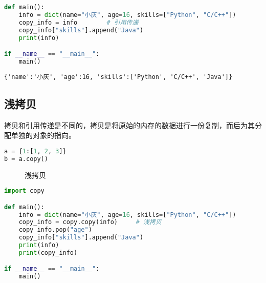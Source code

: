 \begin{lstlisting}[language=Python]
def main():
    info = dict(name="小灰", age=16, skills=["Python", "C/C++"])
    copy_info = info        # 引用传递
    copy_info["skills"].append("Java")
    print(info)

if __name__ == "__main__":
    main()
\end{lstlisting}

\begin{tcolorbox}
    \begin{verbatim}
{'name':'小灰', 'age':16, 'skills':['Python', 'C/C++', 'Java']}
\end{verbatim}
\end{tcolorbox}

\vspace{0.5cm}

\subsection{浅拷贝}

拷贝和引用传递是不同的，拷贝是将原始的内存的数据进行一份复制，而后为其分配单独的对象的指向。

\vspace{-0.5cm}

\begin{lstlisting}[language=Python]
a = {1:[1, 2, 3]}
b = a.copy()
\end{lstlisting}

\begin{figure}[H]
    \centering
    \caption{浅拷贝}
\end{figure}

\vspace{0.5cm}


\begin{lstlisting}[language=Python]
import copy

def main():
    info = dict(name="小灰", age=16, skills=["Python", "C/C++"])
    copy_info = copy.copy(info)     # 浅拷贝
    copy_info.pop("age")
    copy_info["skills"].append("Java")
    print(info)
    print(copy_info)

if __name__ == "__main__":
    main()
\end{lstlisting}

